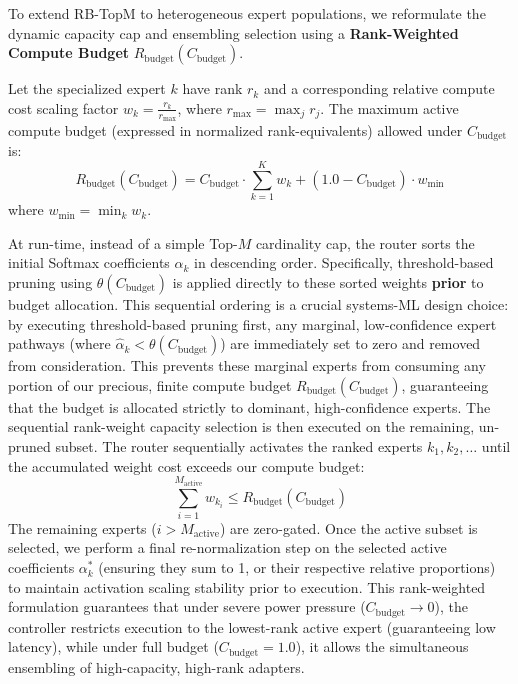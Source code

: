 \documentclass{article}
\theoremstyle{plain}
\theoremstyle{definition}
\theoremstyle{remark}
\begin{document}
To extend RB-TopM to heterogeneous expert populations, we reformulate the dynamic capacity cap and ensembling selection using a \textbf{Rank-Weighted Compute Budget} $R_{\text{budget}}(C_{\text{budget}})$. 

Let the specialized expert $k$ have rank $r_k$ and a corresponding relative compute cost scaling factor $w_k = \frac{r_k}{r_{\max}}$, where $r_{\max} = \max_j r_j$. The maximum active compute budget (expressed in normalized rank-equivalents) allowed under $C_{\text{budget}}$ is:
\begin{equation}
R_{\text{budget}}(C_{\text{budget}}) = C_{\text{budget}} \cdot \sum_{k=1}^K w_k + (1.0 - C_{\text{budget}}) \cdot w_{\min}
\label{eq:heterogeneous_budget}
\end{equation}
where $w_{\min} = \min_k w_k$. 

At run-time, instead of a simple Top-$M$ cardinality cap, the router sorts the initial Softmax coefficients $\hat{\alpha}_k$ in descending order.
Specifically, threshold-based pruning using $\theta(C_{\text{budget}})$ is applied directly to these sorted weights \textbf{prior} to budget allocation.
This sequential ordering is a crucial systems-ML design choice: by executing threshold-based pruning first, any marginal, low-confidence expert pathways (where $\hat{\alpha}_k < \theta(C_{\text{budget}})$) are immediately set to zero and removed from consideration.
This prevents these marginal experts from consuming any portion of our precious, finite compute budget $R_{\text{budget}}(C_{\text{budget}})$, guaranteeing that the budget is allocated strictly to dominant, high-confidence experts.
The sequential rank-weight capacity selection is then executed on the remaining, un-pruned subset.
The router sequentially activates the ranked experts $k_1, k_2, \dots$ until the accumulated weight cost exceeds our compute budget:
\begin{equation}
\sum_{i=1}^{M_{\text{active}}} w_{k_i} \le R_{\text{budget}}(C_{\text{budget}})
\label{eq:heterogeneous_selection}
\end{equation}
The remaining experts ($i > M_{\text{active}}$) are zero-gated. Once the active subset is selected, we perform a final re-normalization step on the selected active coefficients $\alpha^*_{k}$ (ensuring they sum to 1, or their respective relative proportions) to maintain activation scaling stability prior to execution. This rank-weighted formulation guarantees that under severe power pressure ($C_{\text{budget}} \to 0$), the controller restricts execution to the lowest-rank active expert (guaranteeing low latency), while under full budget ($C_{\text{budget}} = 1.0$), it allows the simultaneous ensembling of high-capacity, high-rank adapters.
\end{document}
